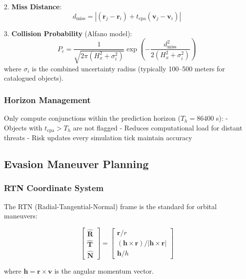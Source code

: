 \documentclass[11pt,a4paper]{article}
\begin{document}
2. \textbf{Miss Distance}:
   \begin{equation}
   d_{\text{miss}} = |(\mathbf{r}_j - \mathbf{r}_i) + t_{\text{cpa}} (\mathbf{v}_j - \mathbf{v}_i)|
   \end{equation}

3. \textbf{Collision Probability} (Alfano model):
   \begin{equation}
   P_c = \frac{1}{\sqrt{2\pi (H_x^2 + \sigma_i^2)}} \exp\left(-\frac{d_{\text{miss}}^2}{2(H_x^2 + \sigma_i^2)}\right)
   \end{equation}
    where $\sigma_i$ is the combined uncertainty radius (typically 100--500 meters for catalogued objects).

\subsubsection{Horizon Management}

Only compute conjunctions within the prediction horizon ($T_h = 86400$ s):
- Objects with $t_{\text{cpa}} > T_h$ are not flagged
- Reduces computational load for distant threats
- Risk updates every simulation tick maintain accuracy

\subsection{Evasion Maneuver Planning}

\subsubsection{RTN Coordinate System}

The RTN (Radial-Tangential-Normal) frame is the standard for orbital maneuvers:

\begin{equation}
\begin{bmatrix}
\mathbf{\hat{R}} \\
\mathbf{\hat{T}} \\
\mathbf{\hat{N}}
\end{bmatrix} = \begin{bmatrix}
\mathbf{r}/r \\
(\mathbf{h} \times \mathbf{r}) / |\mathbf{h} \times \mathbf{r}| \\
\mathbf{h}/h
\end{bmatrix}
\end{equation}

where $\mathbf{h} = \mathbf{r} \times \mathbf{v}$ is the angular momentum vector.
\end{document}
